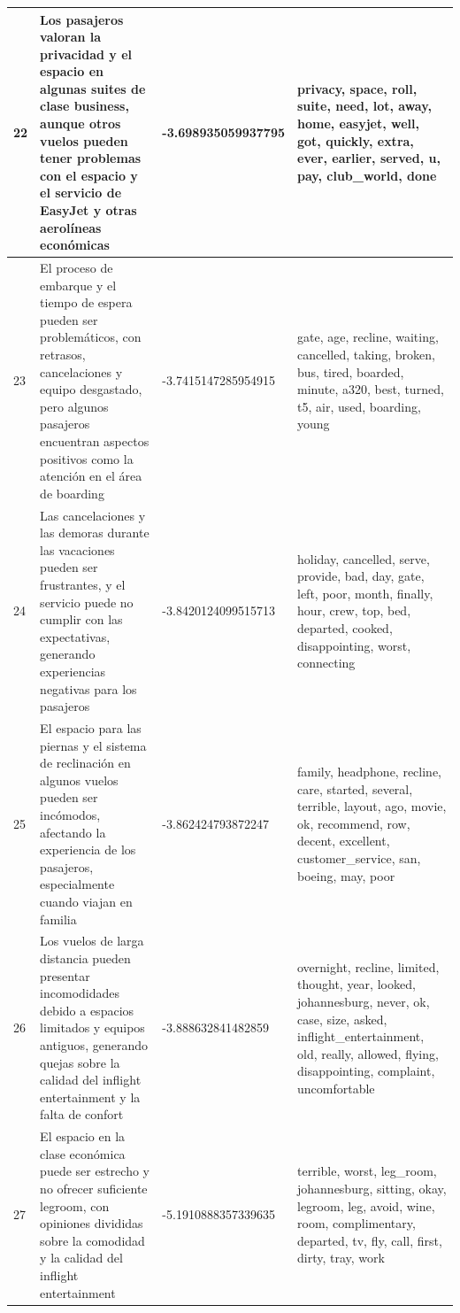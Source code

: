 \documentclass{report}
\begin{document}
{\begin{longtable}{|p{1cm}|p{4cm}|p{4cm}|p{6cm}|}
                    \hline
                    22 & Los pasajeros valoran la privacidad y el espacio en algunas suites de clase business, aunque otros vuelos pueden tener problemas con el espacio y el servicio de EasyJet y otras aerolíneas económicas & -3.698935059937795 & privacy, space, roll, suite, need, lot, away, home, easyjet, well, got, quickly, extra, ever, earlier, served, u, pay, club\_world, done \\
                    \hline
                    23 & El proceso de embarque y el tiempo de espera pueden ser problemáticos, con retrasos, cancelaciones y equipo desgastado, pero algunos pasajeros encuentran aspectos positivos como la atención en el área de boarding & -3.7415147285954915 & gate, age, recline, waiting, cancelled, taking, broken, bus, tired, boarded, minute, a320, best, turned, t5, air, used, boarding, young \\
                    \hline
                    24 & Las cancelaciones y las demoras durante las vacaciones pueden ser frustrantes, y el servicio puede no cumplir con las expectativas, generando experiencias negativas para los pasajeros & -3.8420124099515713 & holiday, cancelled, serve, provide, bad, day, gate, left, poor, month, finally, hour, crew, top, bed, departed, cooked, disappointing, worst, connecting \\
                    \hline
                    25 & El espacio para las piernas y el sistema de reclinación en algunos vuelos pueden ser incómodos, afectando la experiencia de los pasajeros, especialmente cuando viajan en familia & -3.862424793872247 & family, headphone, recline, care, started, several, terrible, layout, ago, movie, ok, recommend, row, decent, excellent, customer\_service, san, boeing, may, poor \\
                    \hline
                    26 & Los vuelos de larga distancia pueden presentar incomodidades debido a espacios limitados y equipos antiguos, generando quejas sobre la calidad del inflight entertainment y la falta de confort & -3.888632841482859 & overnight, recline, limited, thought, year, looked, johannesburg, never, ok, case, size, asked, inflight\_entertainment, old, really, allowed, flying, disappointing, complaint, uncomfortable \\
                    \hline
                    27 & El espacio en la clase económica puede ser estrecho y no ofrecer suficiente legroom, con opiniones divididas sobre la comodidad y la calidad del inflight entertainment & -5.1910888357339635 & terrible, worst, leg\_room, johannesburg, sitting, okay, legroom, leg, avoid, wine, room, complimentary, departed, tv, fly, call, first, dirty, tray, work \\

\end{longtable}}
\end{document}
